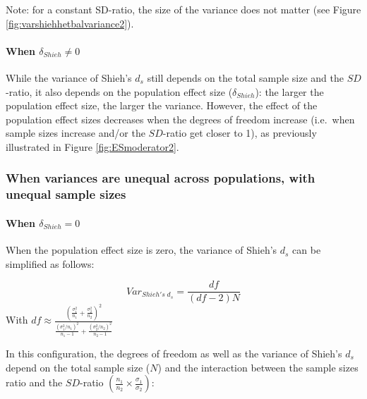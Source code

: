 \documentclass[
  man]{apa6}
\begin{document}
Note: for a constant SD-ratio, the size of the variance does not matter (see Figure \ref{fig:varshiehhetbalvariance2}).

\hypertarget{when-delta_shieh-neq-0-1}{%
\paragraph{\texorpdfstring{When \(\delta_{Shieh} \neq 0\)}{When \textbackslash delta\_\{Shieh\} \textbackslash neq 0}}\label{when-delta_shieh-neq-0-1}}

While the variance of Shieh's \(d_s\) still depends on the total sample size and the \(SD\)-ratio, it also depends on the population effect size (\(\delta_{Shieh}\)): the larger the population effect size, the larger the variance. However, the effect of the population effect sizes decreases when the degrees of freedom increase (i.e.~when sample sizes increase and/or the \(SD\)-ratio get closer to 1), as previously illustrated in Figure \ref{fig:ESmoderator2}.

\hypertarget{when-variances-are-unequal-across-populations-with-unequal-sample-sizes-2}{%
\subsubsection{When variances are unequal across populations, with unequal sample sizes}\label{when-variances-are-unequal-across-populations-with-unequal-sample-sizes-2}}

\hypertarget{when-delta_shieh0-2}{%
\paragraph{\texorpdfstring{When \(\delta_{Shieh}=0\)}{When \textbackslash delta\_\{Shieh\}=0}}\label{when-delta_shieh0-2}}

When the population effect size is zero, the variance of Shieh's \(d_s\) can be simplified as follows:

\[Var_{Shieh's \; d_s} = \frac{df}{(df-2)N}\]
With \(df \approx \frac{\left(\frac{\sigma^2_1}{n_1}+\frac{\sigma^2_2}{n_2} \right)^2}{\frac{(\sigma^2_1/n_1)^2}{n_1-1}+\frac{(\sigma^2_2/n_2)^2}{n_2-1}}\)

In this configuration, the degrees of freedom as well as the variance of Shieh's \(d_s\) depend on the total sample size (\(N\)) and the interaction between the sample sizes ratio and the \(SD\)-ratio \(\left(\frac{n_1}{n_2}\times\frac{\sigma_1}{\sigma_2} \right)\):
\end{document}

